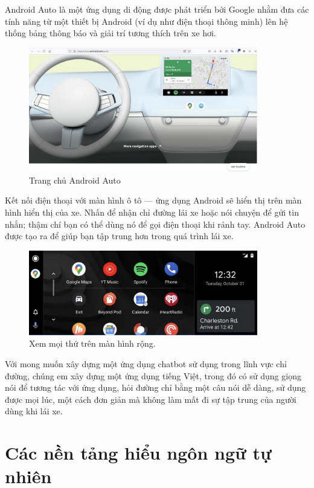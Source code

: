 Android Auto là một ứng dụng di động được phát triển bởi Google nhằm đưa các tính năng từ một thiết bị Android (ví dụ như điện thoại thông minh) lên hệ thống bảng thông báo và giải trí tương thích trên xe hơi.

\begin{figure}[H]
    \centering
    \includegraphics[width=10cm]{images/Android-Auto.png}
    \caption{Trang chủ Android Auto}
    \label{fig:homepage-android-auto}
\end{figure}

Kết nối điện thoại với màn hình ô tô — ứng dụng Android sẽ hiển thị trên màn hình hiển thị của xe. Nhấn để nhận chỉ đường lái xe hoặc nói chuyện để gửi tin nhắn; thậm chí bạn có thể dùng nó để gọi điện thoại khi rảnh tay. Android Auto được tạo ra để giúp bạn tập trung hơn trong quá trình lái xe.

\begin{figure}[H]
    \centering
    \includegraphics[width=10cm]{images/widescreen.png}
    \caption{Xem mọi thứ trên màn hình rộng.}
    \label{fig:homepage-widescreen-Android}
\end{figure}

Với mong muốn xây dựng một ứng dụng chatbot sử dụng trong lĩnh vực chỉ đường, chúng em xây dựng một ứng dụng tiếng Việt, trong đó có sử dụng giọng nói để tương tác với ứng dụng, hỏi đường chỉ bằng một câu nói dễ dàng, sử dụng được mọi lúc, một cách đơn giản mà không làm mất đi sự tập trung của người dùng khi lái xe.

\section{Các nền tảng hiểu ngôn ngữ tự nhiên}


